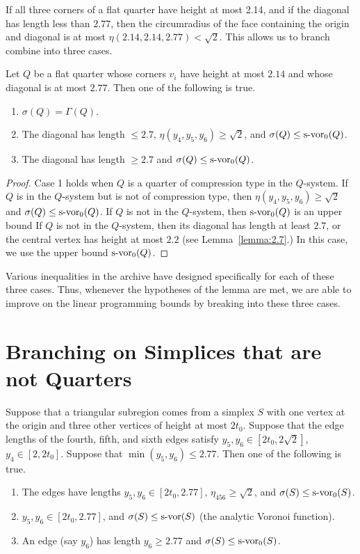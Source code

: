If all three corners of a flat quarter have height at most 2.14,
and if the diagonal has length less than $2.77$, then the
circumradius of the face containing the origin and diagonal is at
most $\eta(2.14,2.14,2.77)<\sqrt2$.  This allows us to branch
combine into three cases.
\begin{lemma}
    Let $Q$ be a flat quarter whose corners $v_i$ have height at most $2.14$ and
    whose diagonal is at most $2.77$.  Then one of the following is true.
        \begin{enumerate}
    \item $\sigma(Q)=\Gamma(Q)$.
    \item The diagonal has length $\le2.7$, $\eta(y_4,y_5,y_6)\ge\sqrt2$,
        and $\sigma(Q)\le \operatorname{s-vor}_0(Q)$.
    \item The diagonal has length $\ge2.7$ and $\sigma(Q)\le\operatorname{s-vor}_0(Q)$.
    \end{enumerate}
\end{lemma}

\begin{proof} Case 1 holds when $Q$ is a quarter of compression
type in the $Q$-system.  If $Q$ is in the $Q$-system but is not of
compression type, then $\eta(y_4,y_5,y_6)\ge\sqrt2$ and
$\sigma(Q)\le \operatorname{s-vor}_0(Q)$.  If $Q$ is not in the $Q$-system, then
$\operatorname{s-vor}_0(Q)$ is an upper bound 
 If $Q$ is not in the
$Q$-system, then its diagonal has length at least $2.7$, or the
central vertex has height at most $2.2$ (see
Lemma~\ref{lemma:2.7}.) In this case, we use the upper bound
$\operatorname{s-vor}_0(Q)$.
\end{proof}

Various inequalities in the archive have designed specifically for
each of these three cases.  Thus, whenever the hypotheses of the
lemma are met, we are able to improve on the linear programming
bounds by breaking into these three cases.

\section{Branching on Simplices that are not Quarters}

\begin{lemma}
Suppose that  a triangular subregion comes from a simplex $S$ with
one vertex at the origin and three other vertices of height at
most $2t_0$.  Suppose that the edge lengths of the fourth, fifth,
and sixth edges satisfy $y_5,y_6\in[2t_0,2\sqrt2]$,
$y_4\in[2,2t_0]$. Suppose that $\min(y_5,y_6)\le2.77$. Then one of
the following is true.
    \begin{enumerate}
    \item  The edges have lengths $y_5,y_6\in[2t_0,2.77]$,
    $\eta_{456}\ge\sqrt2$, and $\sigma(S) \le \operatorname{s-vor}_0(S)$.
    \item
    $y_5,y_6\in[2t_0,2.77]$, and $\sigma(S) \le \operatorname{s-vor}(S)$
     (the analytic Voronoi function).
    \item An edge (say $y_6$)
    has length $y_6\ge2.77$ and $\sigma(S) \le \operatorname{s-vor}_0(S)$.
    \end{enumerate}
\end{lemma}

